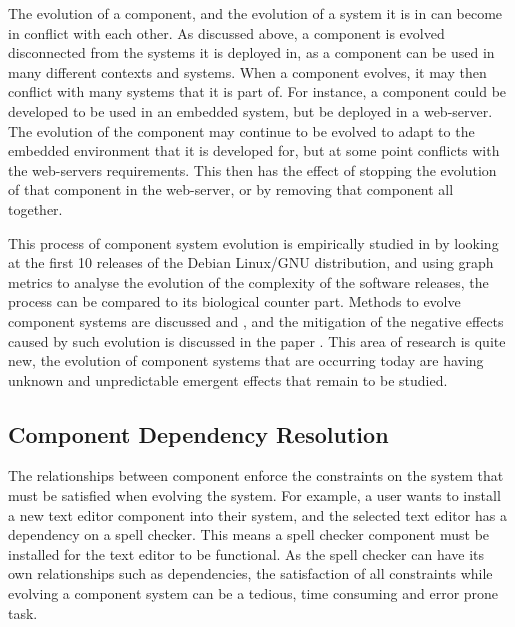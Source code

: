 The evolution of a component, and the evolution of a system it is in can become in conflict with each other.
As discussed above, a component is evolved disconnected from the systems it is deployed in, as a component can be used in many different contexts and systems.
When a component evolves, it may then conflict with many systems that it is part of.
For instance, a component could be developed to be used in an embedded system, but be deployed in a web-server.
The evolution of the component may continue to be evolved to adapt to the embedded environment that it is developed for,
but at some point conflicts with the web-servers requirements.
This then has the effect of stopping the evolution of that component in the web-server, or by removing that component all together.

This process of component system evolution is empirically studied in \cite{fortuna2011} by looking at the first 10 releases of the Debian Linux/GNU distribution,
and using graph metrics to analyse the evolution of the complexity of the software releases, the process can be compared to its biological counter part.
Methods to evolve component systems are discussed \cite{Ryan2005} and \cite{Luo2004},
and the mitigation of the negative effects caused by such evolution is discussed in the paper \cite{Stuckenholz2007}.
This area of research is quite new, the evolution of component systems that are occurring today are having unknown and unpredictable emergent effects that remain to be studied.

\subsection{Component Dependency Resolution}
The relationships between component enforce the constraints on the system that must be satisfied when evolving the system.
For example, a user wants to install a new text editor component into their system, and the selected text editor has a dependency on a spell checker.
This means a spell checker component must be installed for the text editor to be functional.
As the spell checker can have its own relationships such as dependencies, 
the satisfaction of all constraints while evolving a component system can be a tedious, time consuming and error prone task.

